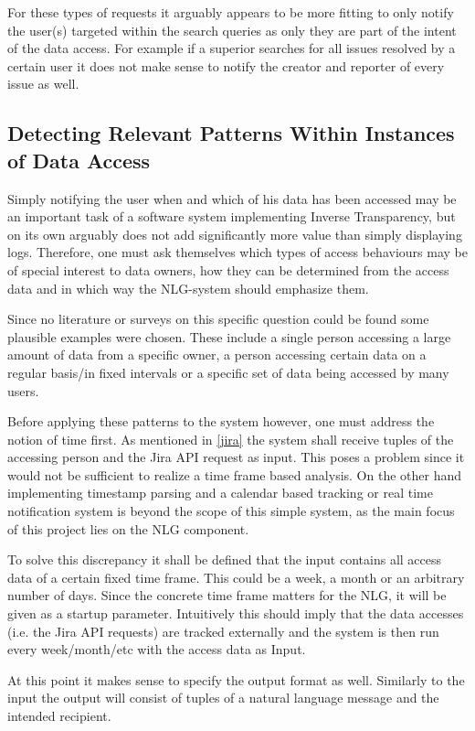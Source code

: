 \documentclass[sigconf,obeyspaces]{acmart}
\begin{document}
For these types of requests it arguably appears to be more fitting to only notify the user(s) targeted within the search queries as only they are part of the intent of the data access. For example if a superior searches for all issues resolved by a certain user it does not make sense to notify the creator and reporter of every issue as well.
 
\subsection{Detecting Relevant Patterns Within Instances of Data Access} \label{patterns}
Simply notifying the user when and which of his data has been accessed may be an important task of a software system implementing Inverse Transparency, but on its own arguably does not add significantly more value than simply displaying logs. Therefore, one must ask themselves which types of access behaviours may be of special interest to data owners, how they can be determined from the access data and in which way the NLG-system should emphasize them.

Since no literature or surveys on this specific question could be found some plausible examples were chosen. These include a single person accessing a large amount of data from a specific owner, a person accessing certain data on a regular basis/in fixed intervals or a specific set of data being accessed by many users. 

Before applying these patterns to the system however, one must address the notion of time first. As mentioned in \ref{jira} the system shall receive tuples of the accessing person and the Jira API request as input. This poses a problem since it would not be sufficient to realize a time frame based analysis. On the other hand implementing timestamp parsing and a calendar based tracking or real time notification system is beyond the scope of this simple system, as the main focus of this project lies on the NLG component.

To solve this discrepancy it shall be defined that the input contains all access data of a certain fixed time frame. This could be a week, a month or an arbitrary number of days. Since the concrete time frame matters for the NLG, it will be given as a startup parameter. Intuitively this should imply that the data accesses (i.e. the Jira API requests) are tracked externally and the system is then run every week/month/etc with the access data as Input.

At this point it makes sense to specify the output format as well. Similarly to the input the output will consist of tuples of a natural language message and the intended recipient.
\end{document}
